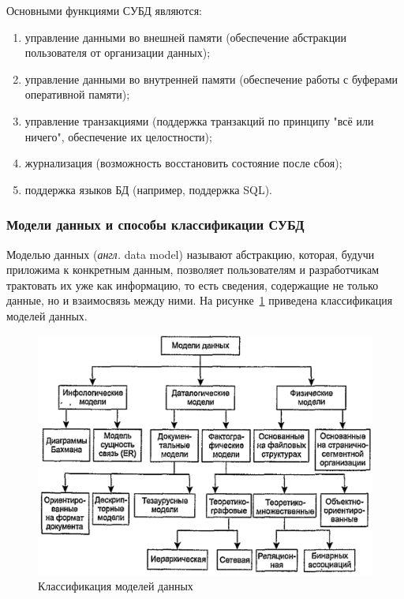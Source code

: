 Основными функциями СУБД являются:
\begin{enumerate}[label=\arabic*)]
	\item управление данными во внешней памяти (обеспечение абстракции пользователя от организации данных);
	\item управление данными во внутренней памяти (обеспечение работы с буферами оперативной памяти);
	\item управление транзакциями (поддержка транзакций по принципу "всё или ничего", обеспечение их целостности);
	\item журнализация (возможность восстановить состояние после сбоя);
	\item поддержка языков БД (например, поддержка SQL).
\end{enumerate}


\subsubsection{Модели данных и способы классификации СУБД}

Моделью данных  (\textit{англ.} data model) \cite{carpova-t-s} называют абстракцию, которая, будучи приложима к
конкретным данным, позволяет пользователям и разработчикам трактовать их уже как информацию, то есть сведения, содержащие не только данные, но и взаимосвязь между ними. На рисунке~\ref{fig:data-models} приведена классификация моделей данных.

\begin{figure}[h]
	\centering
	\captionsetup{justification=centering}
	\includegraphics[width=140mm]{datamodels.png}
	\caption{Классификация моделей данных}
	\label{fig:data-models}
\end{figure}

